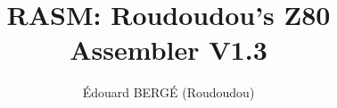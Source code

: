 \usepackage[space]{grffile}
\usepackage{enumitem}
\usepackage{tabularx}

\usepackage[hidelinks]{hyperref}
\usepackage[margin=3cm]{geometry}

\usepackage{makeidx}
\usepackage[table]{xcolor}
\usepackage{framed}
\usepackage{multicol}

\renewenvironment{leftbar}{\def\FrameCommand{\vrule width 0.5pt \hspace{8pt}}\MakeFramed {\advance\hsize-\width \FrameRestore}}{\endMakeFramed}

\newenvironment{code}
{
\begin{leftbar}
\begin{ttfamily}
\bgroup\obeylines
}
{
\egroup
\end{ttfamily}
\end{leftbar}
}


\usepackage{fancyhdr}
\pagestyle{fancy}

\fancyhead[L]{}
\fancyhead[R]{}
\setlength{\parindent}{0pt}

\title{RASM: Roudoudou's Z80 Assembler V1.3}

\author{\'Edouard BERG\'E (Roudoudou)}
\makeindex


\maketitle
\tableofcontents











\appendix




%



